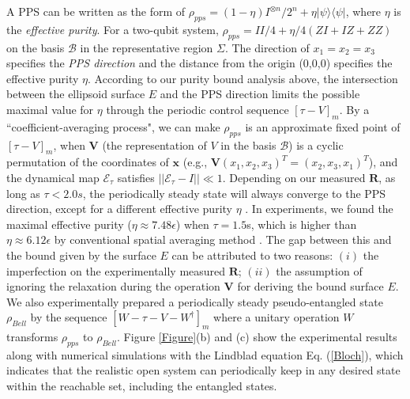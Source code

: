 \documentclass[prl,aps,twocolumn, reprint, amsmath,amssymb,showpacs,superscriptaddress]{revtex4}
\begin{document}
%
A PPS can be written as the form of $\rho_{pps} = (1 - \eta) I^{\otimes n}/2^n + \eta \vert \psi \rangle \langle \psi \vert$, where $\eta$ is the \emph{effective purity}. For a two-qubit system, $\rho_{pps} =  II/4 + \eta/4 (ZI + IZ + ZZ)$ on the basis $\mathcal{B}$ in the representative region $\Sigma$. The direction of ${x}_1 = {x}_2 = {x}_3$ specifies the \emph{PPS direction} and the distance from the origin (0,0,0) specifies the effective purity $\eta$. According to our purity bound analysis above, the intersection between the ellipsoid surface $E$ and the PPS direction limits the possible maximal value for $\eta$ through the periodic control sequence ${\left[ {\tau } - {V}  \right]_m}$.
By a ``coefficient-averaging process", we can make $\rho_{pps}$ is an approximate fixed point of $\left[ \tau - {V} \right]_m$, when $\mathbf{V}$ (the representation of ${V}$ in the basis $\mathcal{B}$) is a cyclic permutation of the coordinates of $\bm{x}$ (e.g., $\mathbf{V}(x_1, x_2, x_3)^T = (x_2, x_3, x_1)^T$), and the dynamical map $\mathcal{E}_{\tau}$ satisfies $|| \mathcal{E}_{\tau} - I || \ll 1$. Depending on our measured $\mathbf{R}$, as long as $\tau < 2.0s$, the periodically steady state will always converge to the PPS direction, except for a different effective purity $\eta$ \cite{S1}. In experiments, we found the maximal effective purity ($\eta \approx 7.48 \epsilon$) when $\tau = 1.5$s, which is higher than $\eta \approx 6.12 \epsilon $ by conventional spatial averaging method \cite{P}. The  gap between this and the bound given by the surface $E$ can be attributed to two reasons: $(i)$ the imperfection on the experimentally measured $\mathbf{R}$; $(ii)$ the assumption of ignoring the relaxation during the operation $\mathbf{V}$ for deriving the bound surface $E$. We also experimentally prepared a periodically steady pseudo-entangled state $\rho_{Bell}$ by the sequence $\left[ W - \tau - V - W^{\dagger} \right]_m$ where a unitary operation
$W$ transforms $\rho_{pps}$ to $\rho_{Bell}$. Figure \ref{Figure}(b) and (c) show the experimental results along with numerical simulations with the Lindblad equation Eq. (\ref{Bloch}), which indicates that the realistic open system can periodically keep in any desired state within the reachable set, including the entangled states.
\end{document}
